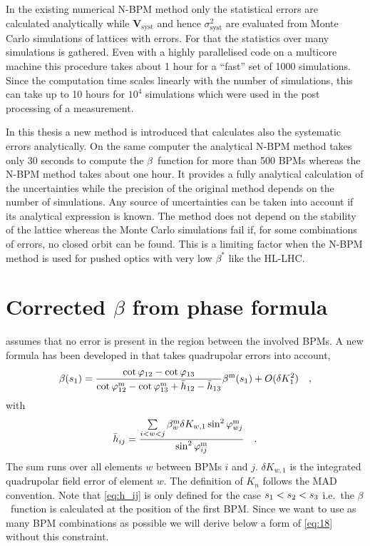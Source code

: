 In the existing numerical N-BPM method only the statistical errors are calculated analytically while
$\mathbf{V}_\text{syst}$ and hence $\sigma_\text{syst}^2$ are evaluated from Monte Carlo simulations
of lattices with errors.
For that the statistics over many simulations is gathered.
Even with a highly parallelised code on a multicore machine this procedure takes about 1 hour for a
``fast'' set of 1000 simulations. Since the computation time scales linearly with the number of simulations,
this can take up to 10 hours for $10^{4}$ simulations which were used in the post processing of a measurement.

In this thesis a new method is introduced that calculates also the systematic errors analytically. 
On the same computer the analytical N-BPM method takes only 30 seconds to compute the $ \beta $~function
for more than 500 BPMs whereas the N-BPM method takes about one hour.
It provides a fully analytical calculation of the uncertainties while the precision of the original
method depends on the number of simulations. Any source of uncertainties can be taken into account
if its analytical expression is known. The method does not depend on the stability of the lattice whereas
the Monte Carlo simulations fail if, for some combinations of errors, no closed orbit can be found.
This is a limiting factor when the N-BPM method is used for pushed optics with very low $ \beta^* $ like the HL-LHC. 



\section{Corrected \texorpdfstring{$\beta$}{beta} from phase formula}
\label{sec_corrected_beta_from_phase}
 assumes that no error is present in the region between the involved BPMs.
A new formula has been developed in \cite{Franchi2016} that takes quadrupolar errors into account,
%
\begin{equation}
\beta(s_1) = \frac{\cot\varphi_{12} - \cot\varphi_{13}}{\cot\varphi_{12}^\text{m} - \cot\varphi_{13}^\text{m} +\bar{h}_{12} - \bar{h}_{13}}\beta^\text{m}(s_1) + O(\delta K_1^2)
\quad ,
\label{eq:18}
\end{equation}
%
with 
%
\begin{equation}
\bar{h}_{ij} =  \dfrac{\sum\limits_{i<w<j}\beta_w^\text{m}\delta K_{w,1}\sin^2\varphi_{wj}^\text{m}}{\sin^2\varphi_{ij}^\text{m}}
\quad .
\label{eq:h_ij}
\end{equation}
%
The sum runs over all elements $ w $ between BPMs $i$ and $j$. $\delta K_{w,1}$ is the integrated quadrupolar field error
of element $w$. The definition of $ K_n $ follows the MAD \cite{madx} convention.
Note that \eqref{eq:h_ij} is only defined for the case $ s_1 <\nobreak s_2 < s_3 $ i.e.~the
$ \beta $~function is calculated at the position of the first BPM. Since we want to use as many BPM
combinations as possible we will derive below a form of \eqref{eq:18} without this constraint.

